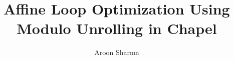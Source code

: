 \documentclass[10pt,letterpaper,twocolumn]{article}
\begin{document}

\title{Affine Loop Optimization Using Modulo Unrolling in Chapel}
\author{Aroon Sharma}
           
\maketitle













{
%
\begin{singlespace}
\vspace{-3ex}

\vspace{-2ex}

%
\end{singlespace}
}

%
%
%

%
\end{document}
